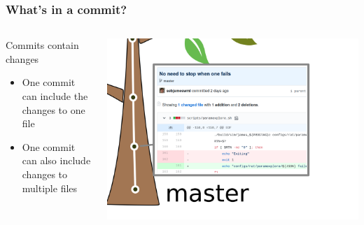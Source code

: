 \documentclass{beamer}
\begin{document}
\begin{frame}
  \frametitle{What's in a commit?}
  \begin{columns}[T]
    \begin{column}{.3\textwidth}
      \begin{block}{Commits contain changes}
        \begin{itemize}
        \item One commit can include the changes to one file
        \item One commit can also include changes to multiple files
        \end{itemize}
      \end{block}
    \end{column}
    \begin{column}{.7\textwidth}
      \includegraphics[width=\textwidth]{tree_mastercommits_commitdetail.png}
    \end{column}
  \end{columns}
\end{frame}
\end{document}
